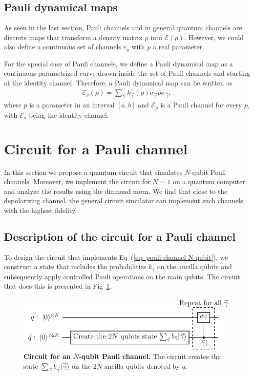 \documentclass[10pt,letterpaper]{article} %
\newcommand{\fref}[1]{Fig~\ref{#1}}
\newcommand{\eref}[1]{Eq~(\ref{#1})}
\begin{document}
\subsection{Pauli dynamical maps} %
\label{subsec: Pauli Dynamical Maps}


As seen in the last section, Pauli channels and in 
general quantum channels are discrete maps
that transform a density matrix $\rho$ into $\mathcal{E}(\rho)$.
However, we could also define a continuous set of 
channels $\varepsilon_p$ with $p$ a real parameter.

For the special case of Pauli channels, we define 
a Pauli dynamical map as a continuous parametrized 
curve drawn inside the set of Pauli channels and starting at the identity channel. 
Therefore, a Pauli dynamical map can be written as
\begin{eqnarray}
\label{eq: Pauli dynamical map}
\mathcal{E}_p(\rho) = \sum_{\vec{\gamma}} k_{\vec{\gamma}}(p) \sigma_{\vec{\gamma}} \rho \sigma_{\vec{\gamma}},
\end{eqnarray}
where $p$ is a parameter in an interval $[a,b]$ 
and $\mathcal{E}_p$ is a Pauli channel for every $p$, 
with $\mathcal{E}_a$ being the identity channel.

\section{Circuit for a Pauli channel} %
\label{sec: Circuit for a Pauli Channel}

In this section we propose a quantum circuit that simulates $N$-qubit Pauli
channels.  Moreover, we implement the circuit for $N=1$ on a quantum computer
and analyze the results using the diamond norm.
We find that close to the depolarizing channel, the general circuit simulator 
can implement such channels with the highest fidelity. 
\subsection{Description of the circuit for a Pauli channel} %
\label{subsec: Description of the circuit}

To design the circuit that implements \eref{eq: pauli channel N-qubit}, we construct a state that 
includes the probabilities $k_{\gamma}$ on the ancilla qubits and subsequently
apply controlled Pauli operations on the main qubits.  The circuit that does
this is presented in \fref{Fig1}. 


\begin{figure} %
\centering
\includegraphics{images/circuito_general.pdf}
\caption{{\bf Circuit for an $N$-qubit
Pauli channel.}
The circuit creates the state $\sum_{\vec{\gamma}} b_{\vec{\gamma}}|\vec{\gamma}\rangle$ 
on the $2N$ ancilla qubits denoted by $\tilde{q}$.}
\label{Fig1}
\end{figure} %
\end{document}
